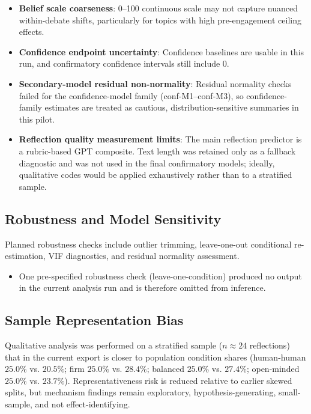\begin{itemize}
    \item \textbf{Belief scale coarseness}: 0--100 continuous scale may not capture nuanced within-debate shifts,
          particularly for topics with high pre-engagement ceiling effects.
    \item \textbf{Confidence endpoint uncertainty}: Confidence baselines are usable in this run,
          and confirmatory confidence intervals still include 0.
    \item \textbf{Secondary-model residual non-normality}: Residual normality checks failed for
          the confidence-model family (conf-M1--conf-M3), so confidence-family estimates
          are treated as cautious, distribution-sensitive summaries in this pilot.
    \item \textbf{Reflection quality measurement limits}: The main reflection predictor is a rubric-based GPT composite.
          Text length was retained only as a fallback diagnostic and was not used in the final confirmatory models;
          ideally, qualitative codes would be applied exhaustively rather than to a stratified sample.
\end{itemize}

\subsection{Robustness and Model Sensitivity}

Planned robustness checks include outlier trimming, leave-one-out conditional re-estimation, VIF diagnostics, and residual normality assessment.
\begin{itemize}
    \item One pre-specified robustness check (leave-one-condition) produced no output in the current analysis run and is therefore omitted from inference.
\end{itemize}

\subsection{Sample Representation Bias}

Qualitative analysis was performed on a stratified sample ($n \approx 24$ reflections)
that in the current export is closer to population condition shares
(human-human $25.0\%$ vs. $20.5\%$; firm $25.0\%$ vs. $28.4\%$; balanced $25.0\%$ vs. $27.4\%$;
open-minded $25.0\%$ vs. $23.7\%$).
Representativeness risk is reduced relative to earlier skewed splits, but mechanism findings remain exploratory,
hypothesis-generating, small-sample, and not effect-identifying.


